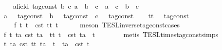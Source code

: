 \begin{isabellebody}
\ \ \isamarkupfalse%
\ {\isacartoucheopen}{\isasymAnd}{\isacharparenleft}a{\isacharcolon}{\isacharcolon}{\isacharparenleft}{\isacharprime}{\isasymtau}{\isacharcolon}{\isacharcolon}field\ tag{\isacharunderscore}const{\isacharparenright}{\isacharparenright}\ b\ c{\isachardot}\ {\isacharparenleft}a\ {\isacharplus}\ b{\isacharparenright}\ {\isacharasterisk}\ c\ {\isacharequal}\ a\ {\isacharasterisk}\ c\ {\isacharplus}\ b\ {\isacharasterisk}\ c{\isacartoucheclose}\isanewline
\ \ \isamarkupfalse%
\ {\isacharminus}\isanewline
\ \ \ \ \isamarkupfalse%
\ a\ {\isacharcolon}{\isacharcolon}\ {\isachardoublequoteopen}{\isacharprime}{\isasymtau}\ tag{\isacharunderscore}const{\isachardoublequoteclose}\ \ b\ {\isacharcolon}{\isacharcolon}\ {\isachardoublequoteopen}{\isacharprime}{\isasymtau}\ tag{\isacharunderscore}const{\isachardoublequoteclose}\ \ c\ {\isacharcolon}{\isacharcolon}\ {\isachardoublequoteopen}{\isacharprime}{\isasymtau}\ tag{\isacharunderscore}const{\isachardoublequoteclose}\isanewline
\ \ \isamarkupfalse%
\ tt\ {\isacharcolon}{\isacharcolon}\ {\isachardoublequoteopen}{\isacharprime}{\isasymtau}\ tag{\isacharunderscore}const\ {\isasymRightarrow}\ {\isacharprime}{\isasymtau}{\isachardoublequoteclose}\ \isanewline
\ \ \ \ f{}{\isacharcolon}\ {\isachardoublequoteopen}{\isasymforall}t{\isachardot}\ t\ {\isacharequal}\ {\isasymtau}\isactrlsub c\isactrlsub s\isactrlsub t\ {\isacharparenleft}tt\ t{\isacharparenright}{\isachardoublequoteclose}\isanewline
\ \ \ \ \isamarkupfalse%
\ {\isacharparenleft}meson\ TESL{\isachardot}inverse{\isacharunderscore}tag{\isacharunderscore}const{\isachardot}cases{\isacharparenright}\isanewline
\ \ \ \ \isamarkupfalse%
\ \isamarkupfalse%
\ f{}{\isacharcolon}\ {\isachardoublequoteopen}{\isasymforall}t\ ta{\isachardot}\ {\isasymtau}\isactrlsub c\isactrlsub s\isactrlsub t\ {\isacharparenleft}ta\ {\isacharasterisk}\ tt\ t{\isacharparenright}\ {\isacharequal}\ {\isasymtau}\isactrlsub c\isactrlsub s\isactrlsub t\ ta\ {\isacharasterisk}\ t{\isachardoublequoteclose}\isanewline
\ \ \ \ \ \ \isamarkupfalse%
\ {\isacharparenleft}metis\ TESL{\isachardot}times{\isacharunderscore}tag{\isacharunderscore}const{\isachardot}simps{\isacharparenright}\isanewline
\ \ \ \ \isamarkupfalse%
\ {\isachardoublequoteopen}{\isasymforall}t\ ta{\isachardot}\ {\isasymtau}\isactrlsub c\isactrlsub s\isactrlsub t\ {\isacharparenleft}tt\ ta\ {\isacharasterisk}\ t{\isacharparenright}\ {\isacharequal}\ ta\ {\isacharasterisk}\ {\isasymtau}\isactrlsub c\isactrlsub s\isactrlsub t\ t{\isachardoublequoteclose}\isanewline

\end{isabellebody}
